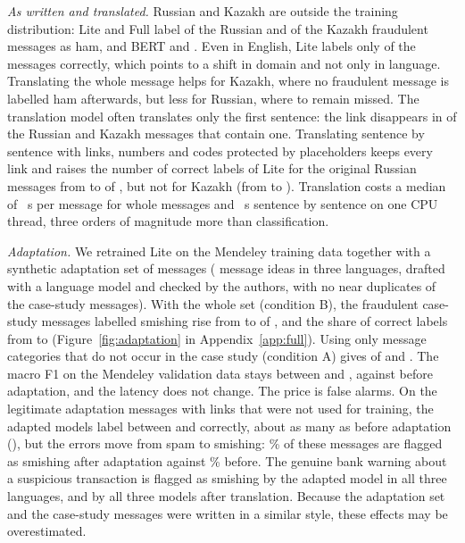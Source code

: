 \emph{As written and translated.} Russian and Kazakh are outside the training distribution: Lite and Full label  of the  Russian and  of the  Kazakh fraudulent messages as ham, and BERT  and . Even in English, Lite labels only  of the  messages correctly, which points to a shift in domain and not only in language. Translating the whole message helps for Kazakh, where no fraudulent message is labelled ham afterwards, but less for Russian, where  to  remain missed. The translation model often translates only the first sentence: the link disappears in  of the  Russian and Kazakh messages that contain one. Translating sentence by sentence with links, numbers and codes protected by placeholders keeps every link and raises the number of correct labels of Lite for the original Russian messages from  to  of , but not for Kazakh (from  to ). Translation costs a median of ~s per message for whole messages and ~s sentence by sentence on one CPU thread, three orders of magnitude more than classification.

\emph{Adaptation.} We retrained Lite on the Mendeley training data together with a synthetic adaptation set of  messages ( message ideas in three languages, drafted with a language model and checked by the authors, with no near duplicates of the case-study messages). With the whole set (condition B), the fraudulent case-study messages labelled smishing rise from  to  of , and the share of correct labels from  to  (Figure~\ref{fig:adaptation} in Appendix~\ref{app:full}). Using only message categories that do not occur in the case study (condition A) gives  of  and . The macro F1 on the Mendeley validation data stays between  and , against  before adaptation, and the latency does not change. The price is false alarms. On the legitimate adaptation messages with links that were not used for training, the adapted models label between  and  correctly, about as many as before adaptation (), but the errors move from spam to smishing: \% of these messages are flagged as smishing after adaptation against \% before. The genuine bank warning about a suspicious transaction is flagged as smishing by the adapted model in all three languages, and by all three models after translation. Because the adaptation set and the case-study messages were written in a similar style, these effects may be overestimated.

